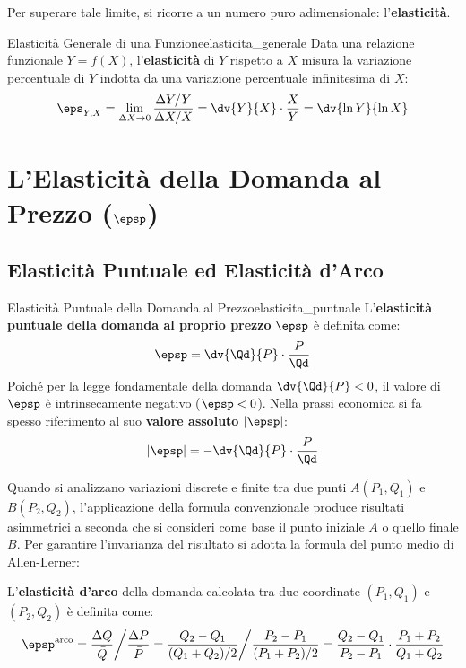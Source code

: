 Per superare tale limite, si ricorre a un numero puro adimensionale: l'\textbf{elasticità}.

\begin{definizione}{Elasticità Generale di una Funzione}{elasticita_generale}
Data una relazione funzionale $Y = f(X)$, l'\textbf{elasticità} di $Y$ rispetto a $X$ misura la variazione percentuale di $Y$ indotta da una variazione percentuale infinitesima di $X$:
\begin{equation}
    \eps_{Y,X} = \lim_{\Delta X \to 0} \frac{\Delta Y / Y}{\Delta X / X} = \dv{Y}{X} \cdot \frac{X}{Y} = \dv{\ln Y}{\ln X}
\end{equation}
\end{definizione}

\section{L'Elasticità della Domanda al Prezzo ($\epsp$)}

\subsection{Elasticità Puntuale ed Elasticità d'Arco}

\begin{definizione}{Elasticità Puntuale della Domanda al Prezzo}{elasticita_puntuale}
L'\textbf{elasticità puntuale della domanda al proprio prezzo} $\epsp$ è definita come:
\begin{equation}
    \epsp = \dv{\Qd}{P} \cdot \frac{P}{\Qd}
\end{equation}
Poiché per la legge fondamentale della domanda $\dv{\Qd}{P} < 0$, il valore di $\epsp$ è intrinsecamente negativo ($\epsp < 0$). Nella prassi economica si fa spesso riferimento al suo \textbf{valore assoluto} $|\epsp|$:
\begin{equation}
    |\epsp| = - \dv{\Qd}{P} \cdot \frac{P}{\Qd}
\end{equation}
\end{definizione}

Quando si analizzano variazioni discrete e finite tra due punti $A(P_1, Q_1)$ e $B(P_2, Q_2)$, l'applicazione della formula convenzionale produce risultati asimmetrici a seconda che si consideri come base il punto iniziale $A$ o quello finale $B$. Per garantire l'invarianza del risultato si adotta la formula del punto medio di Allen-Lerner:

\begin{metodo}
L'\textbf{elasticità d'arco} della domanda calcolata tra due coordinate $(P_1, Q_1)$ e $(P_2, Q_2)$ è definita come:
\begin{equation}
    \epsp^{\text{arco}} = \frac{\Delta Q}{\bar{Q}} \bigg/ \frac{\Delta P}{\bar{P}} = \frac{Q_2 - Q_1}{(Q_1 + Q_2)/2} \bigg/ \frac{P_2 - P_1}{(P_1 + P_2)/2} = \frac{Q_2 - Q_1}{P_2 - P_1} \cdot \frac{P_1 + P_2}{Q_1 + Q_2}
\end{equation}
\end{metodo}

